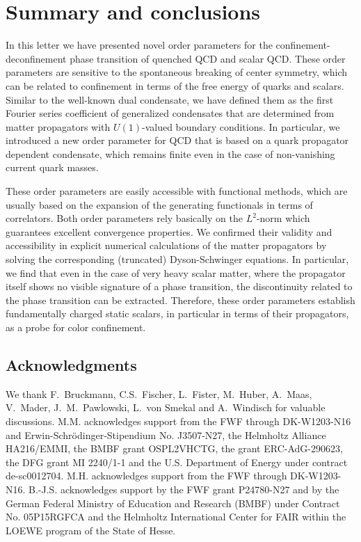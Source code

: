 \documentclass[final,twocolumn,merge,sort&compress]{elsarticle}
\begin{document}
\section{Summary and conclusions}
\label{sec:summary}

In this letter we have presented novel order parameters for the
confinement-deconfinement phase transition of quenched QCD and scalar
QCD.  These order parameters are sensitive to the spontaneous breaking
of center symmetry, which can be related to confinement in terms of
the free energy of quarks and scalars. Similar to the well-known dual
condensate, we have defined them as the first Fourier series
coefficient of generalized condensates that are determined from matter
propagators with $U(1)$-valued boundary conditions.  In particular, we
introduced a new order parameter for QCD that is based on a quark
propagator dependent condensate, which remains finite even in the case
of non-vanishing current quark masses.

These order parameters are easily accessible with functional methods,
which are usually based on the expansion of the generating functionals
in terms of correlators. Both order parameters rely basically on the
$L^2$-norm which guarantees excellent convergence properties. We
confirmed their validity and accessibility in explicit numerical
calculations of the matter propagators by solving the corresponding
(truncated) Dyson-Schwinger equations. In particular, we find that
even in the case of very heavy scalar matter, where the propagator
itself shows no visible signature of a phase transition, the
discontinuity related to the phase transition can be extracted.
Therefore, these order parameters establish fundamentally charged
static scalars, in particular in terms of their propagators, as a
probe for color confinement.



\subsection*{Acknowledgments}
We thank F.~Bruckmann, C.S.~Fischer, L.~Fister, M.~Huber, A.~Maas,
V.~Mader, J.~M.~Pawlowski, L.~von Smekal and A.~Windisch for valuable
discussions.
%
M.M. acknowledges support from the FWF through DK-W1203-N16 and
Erwin-Schr\"odinger-Stipendium No. J3507-N27, the Helmholtz Alliance
HA216/EMMI, the BMBF grant OSPL2VHCTG, the grant 
ERC-AdG-290623, the DFG grant MI 2240/1-1 and the U.S. 
Department of Energy under contract de-sc0012704.
M.H. acknowledges support from the FWF through DK-W1203-N16.
B.-J.S. acknowledges support by the FWF grant P24780-N27 and by the
German Federal Ministry of Education and Research (BMBF) under
Contract No. 05P15RGFCA and the Helmholtz International Center for
FAIR within the LOEWE program of the State of Hesse.


% 
\end{document}
